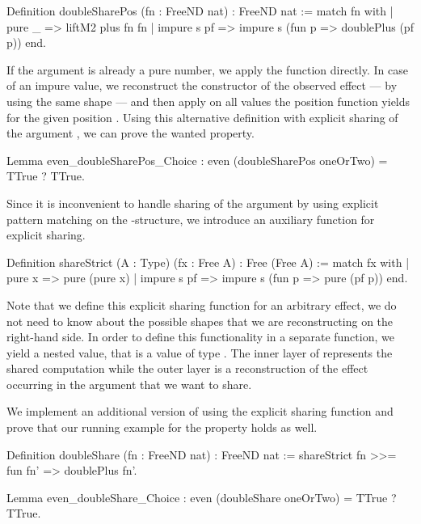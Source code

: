 \begin{coqcode}
Definition doubleSharePos (fn : FreeND nat) : FreeND nat :=
  match fn with
  | pure _      => liftM2 plus fn fn
  | impure s pf => impure s (fun p => doublePlus (pf p))
 end.
\end{coqcode}

If the argument  is already a pure number, we apply the function  directly.
In case of an impure value, we reconstruct the constructor of the observed effect --- by using the same shape  --- and then apply  on all values the position function  yields for the given position .
Using this alternative definition with explicit sharing of the argument , we can prove the wanted property.

\begin{coqcode}
Lemma even_doubleSharePos_Choice :
  even (doubleSharePos oneOrTwo) = TTrue ? TTrue.
\end{coqcode}

Since it is inconvenient to handle sharing of the argument  by using explicit pattern matching on the \--structure, we introduce an auxiliary function for explicit sharing.

\begin{coqcode}
Definition shareStrict (A : Type) (fx : Free A) : Free (Free A) :=
  match fx with
  | pure x      => pure (pure x)
  | impure s pf => impure s (fun p => pure (pf p))
  end.
\end{coqcode}

Note that we define this explicit sharing function for an arbitrary effect, we do not need to know about the possible shapes that we are reconstructing on the right\--hand side.
In order to define this functionality in a separate function, we yield a nested value, that is a value of type .
The inner layer of  represents the shared computation while the outer layer is a reconstruction of the effect occurring in the argument  that we want to share.

We implement an additional version of  using the explicit sharing function and prove that our running example for the property holds as well.

\begin{coqcode}
Definition doubleShare (fn : FreeND nat) : FreeND nat :=
  shareStrict fn >>= fun fn' => doublePlus fn'.

Lemma even_doubleShare_Choice :
  even (doubleShare oneOrTwo) = TTrue ? TTrue.
\end{coqcode}

